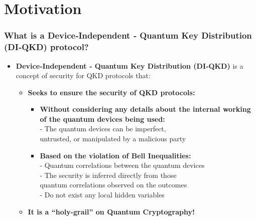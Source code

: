 \documentclass{beamer}
\begin{document}
    \section{Motivation}

    \begin{frame}
        \frametitle{\footnotesize What is a Device‑Independent ‑ Quantum Key Distribution (DI‑QKD) protocol?}

        \vspace{2.5ex}
        \begin{itemize}
            \item \textbf{Device‑Independent ‑ Quantum Key Distribution (DI‑QKD)} is a concept of security for QKD protocols that:
            \begin{itemize}
                \item \textbf{Seeks to ensure the security of QKD protocols:}
                \begin{itemize}
                    \item \textbf{Without considering any details about the internal working of the quantum devices being used:}\\
                    - The quantum devices can be imperfect,\\\hspace{0.5em}untrusted, or manipulated by a malicious party
                    \item \textbf{Based on the violation of Bell Inequalities:}\\
                    - Quantum correlations between the quantum devices\\
                    - The security is inferred directly from those\\\hspace{0.5em}quantum correlations observed on the outcomes\\
                    - Do not exist any local hidden variables
                \end{itemize}
                \vspace{0.5ex}
                \item \textbf{It is a ``holy-grail'' on Quantum Cryptography!}
            \end{itemize}
        \end{itemize}
    \end{frame}
\end{document}
